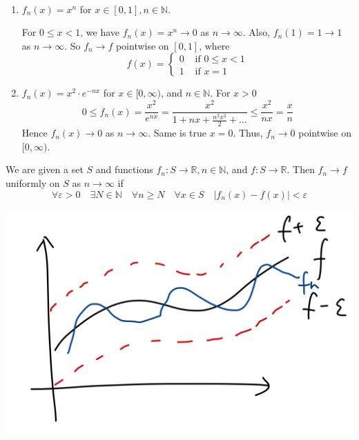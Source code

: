 \documentclass[a4paper]{article}
\begin{document}
\begin{example}\
    \begin{enumerate}
        \item $f_{n}(x)=x^{n}$ for $x \in[0,1], n \in \mathbb{N}$.
        
        For $0 \leqslant x<1$, we have $f_{n}(x)=x^{n} \rightarrow 0$ as $n \rightarrow \infty$.
        Also, $f_{n}(1)=1 \rightarrow 1$ as $n \rightarrow \infty$. So $f_{n} \rightarrow f$ pointwise on $[0,1]$, where
        \[
        f(x)= \begin{cases}0 & \text { if } 0 \leqslant x<1 \\ 1 & \text { if } x=1\end{cases}
        \]
        \item $f_{n}(x)=x^{2} \cdot e^{-n x}$ for $x \in[0, \infty)$, and $n \in \mathbb{N}$. For $x>0$
        \[
        0 \leqslant f_{n}(x)=\frac{x^{2}}{e^{n x}}=\frac{x^{2}}{1+n x+\frac{n^{2} x^{2}}{2}+\ldots} \leqslant \frac{x^{2}}{n x}=\frac{x}{n}
        \]
        Hence $f_{n}(x) \rightarrow 0$ as $n \rightarrow \infty$. Same is true $x=0$. Thus, $f_{n} \rightarrow 0$ pointwise on $[0, \infty)$.
    \end{enumerate}
\end{example}

\begin{definition}
    We are given a set $S$ and functions $f_{n}: S \rightarrow \mathbb{R}, n \in \mathbb{N}$, and $f: S \rightarrow \mathbb{R}$. Then $f_{n} \rightarrow f$ uniformly on $S$ as $n \rightarrow \infty$ if
    \[
    \forall \varepsilon>0 \quad \exists N \in \mathbb{N} \quad \forall n \geqslant N \quad \forall x \in S \quad\left|f_{n}(x)-f(x)\right|<\varepsilon
    \]
    \begin{center}
        \includegraphics[scale=0.11]{at1.jpeg}
    \end{center}
\end{definition}
\end{document}
